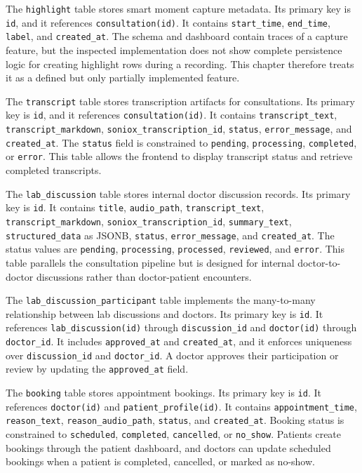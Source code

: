 The \texttt{highlight} table stores smart moment capture metadata. Its primary key is \texttt{id}, and it references \texttt{consultation(id)}. It contains \texttt{start\_time}, \texttt{end\_time}, \texttt{label}, and \texttt{created\_at}. The schema and dashboard contain traces of a capture feature, but the inspected implementation does not show complete persistence logic for creating highlight rows during a recording. This chapter therefore treats it as a defined but only partially implemented feature.

The \texttt{transcript} table stores transcription artifacts for consultations. Its primary key is \texttt{id}, and it references \texttt{consultation(id)}. It contains \texttt{transcript\_text}, \texttt{transcript\_markdown}, \texttt{soniox\_transcription\_id}, \texttt{status}, \texttt{error\_message}, and \texttt{created\_at}. The \texttt{status} field is constrained to \texttt{pending}, \texttt{processing}, \texttt{completed}, or \texttt{error}. This table allows the frontend to display transcript status and retrieve completed transcripts.

The \texttt{lab\_discussion} table stores internal doctor discussion records. Its primary key is \texttt{id}. It contains \texttt{title}, \texttt{audio\_path}, \texttt{transcript\_text}, \texttt{transcript\_markdown}, \texttt{soniox\_transcription\_id}, \texttt{summary\_text}, \texttt{structured\_data} as JSONB, \texttt{status}, \texttt{error\_message}, and \texttt{created\_at}. The status values are \texttt{pending}, \texttt{processing}, \texttt{processed}, \texttt{reviewed}, and \texttt{error}. This table parallels the consultation pipeline but is designed for internal doctor-to-doctor discussions rather than doctor-patient encounters.

The \texttt{lab\_discussion\_participant} table implements the many-to-many relationship between lab discussions and doctors. Its primary key is \texttt{id}. It references \texttt{lab\_discussion(id)} through \texttt{discussion\_id} and \texttt{doctor(id)} through \texttt{doctor\_id}. It includes \texttt{approved\_at} and \texttt{created\_at}, and it enforces uniqueness over \texttt{discussion\_id} and \texttt{doctor\_id}. A doctor approves their participation or review by updating the \texttt{approved\_at} field.

The \texttt{booking} table stores appointment bookings. Its primary key is \texttt{id}. It references \texttt{doctor(id)} and \texttt{patient\_profile(id)}. It contains \texttt{appointment\_time}, \texttt{reason\_text}, \texttt{reason\_audio\_path}, \texttt{status}, and \texttt{created\_at}. Booking status is constrained to \texttt{scheduled}, \texttt{completed}, \texttt{cancelled}, or \texttt{no\_show}. Patients create bookings through the patient dashboard, and doctors can update scheduled bookings when a patient is completed, cancelled, or marked as no-show.

